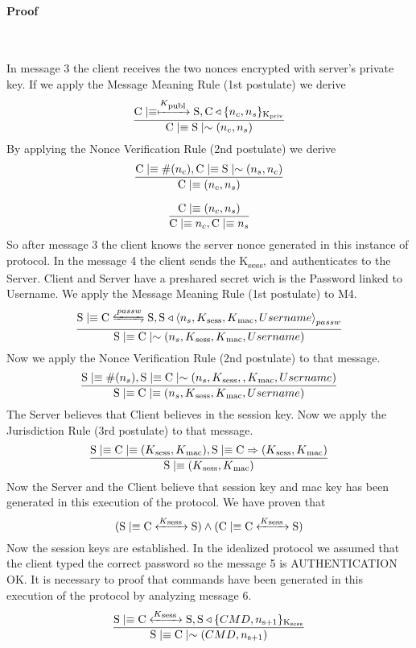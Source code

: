 \paragraph{Proof}\mbox{} \\

\par In message 3 the client receives the two nonces encrypted with server's private key. If we apply the Message Meaning Rule (1st postulate) we derive
\[ \frac{\textnormal{C} \mid\equiv \xmapsto{K\textsubscript{publ}} \textnormal{S}, 	\textnormal{C} \triangleleft \lbrace n_c,n_s \rbrace \textsubscript{K\textsubscript{priv}}}
        {\textnormal{C} \mid\equiv \textnormal{S} \mid\sim (n_c,n_s)}  \]
By applying the Nonce Verification Rule (2nd postulate) we derive
\[ \frac{\textnormal{C} \mid\equiv \#(n_c), \textnormal{C} \mid\equiv \textnormal{S} \mid\sim (n_s,n_c)}{\textnormal{C} \mid\equiv (n_c,n_s)} \]

\[ \frac{\textnormal{C} \mid\equiv (n_c,n_s)}{\textnormal{C} \mid\equiv n_c, \textnormal{C} \mid\equiv n_s} \]
So after message 3 the client knows the server nonce generated in this instance of protocol. In the message 4 the client sends the K\textsubscript{sess}, and authenticates to the Server. Client and Server have a preshared secret wich is the Password linked to Username. We apply the Message Meaning Rule (1st postulate) to M4.
\[ \frac{\textnormal{S} \believes \textnormal{C} \secret{passw} \textnormal{S}, \textnormal{S} \sees \combine{n_s,K\textsubscript{sess},K\textsubscript{mac},Username}{passw}}{\textnormal{S}\believes \textnormal{C} \oncesaid (n_s,K\textsubscript{sess},K\textsubscript{mac},Username)} \]
Now we apply the Nonce Verification Rule (2nd postulate) to that message.
\[ \frac{\textnormal{S}\mid\equiv \#(n_s), \textnormal{S} \mid\equiv \textnormal{C} \mid\sim (n_s,K\textsubscript{sess},,K\textsubscript{mac},Username)}
   {\textnormal{S} \mid\equiv \textnormal{C} \mid\equiv (n_s,K\textsubscript{sess},K\textsubscript{mac},Username)}	\]
The Server believes that Client believes in the session key. Now we apply the Jurisdiction Rule (3rd postulate) to that message.
\[ \frac{\textnormal{S} \mid\equiv \textnormal{C} \mid\equiv (K\textsubscript{sess},K\textsubscript{mac}), \textnormal{S} \mid\equiv \textnormal{C} \Rightarrow (K\textsubscript{sess},K\textsubscript{mac})}
        {\textnormal{S} \mid\equiv (K\textsubscript{sess},K\textsubscript{mac}) } \]
Now the Server and the Client believe that session key and mac key has been generated in this execution of the protocol. We have proven that
\[ (\textnormal{S} \mid\equiv \textnormal{C} \xleftrightarrow{K\textsubscript{sess }} \textnormal{S}) \wedge (\textnormal{C} \mid\equiv \textnormal{C} \xleftrightarrow{K\textsubscript{sess }} \textnormal{S}) \]
Now the session keys are established. In the idealized protocol we assumed that the client typed the correct password so the message 5 is AUTHENTICATION OK. It is necessary to proof that commands have been generated in this execution of the protocol by analyzing message 6.
\[ \frac{\textnormal{S} \mid\equiv \textnormal{C} \xleftrightarrow{K\textsubscript{sess }} \textnormal{S}, \textnormal{S} \triangleleft \lbrace CMD, n\textsubscript{s+1} \rbrace \textsubscript{K\textsubscript{sess}} }{ \textnormal{S} \mid\equiv \textnormal{C} \mid\sim (CMD,n\textsubscript{s+1}) }\]

